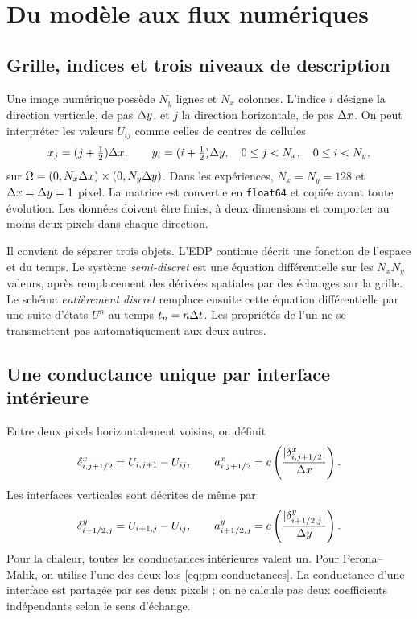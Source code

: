 \section{Du modèle aux flux numériques}
\label{sec:schemes}

\subsection{Grille, indices et trois niveaux de description}

Une image numérique possède $N_y$ lignes et $N_x$ colonnes. L'indice $i$
désigne la direction verticale, de pas $\Delta y$, et $j$ la direction
horizontale, de pas $\Delta x$. On peut interpréter les valeurs $U_{ij}$
comme celles de centres de cellules
\begin{equation}
 x_j=(j+\tfrac12)\Delta x,\qquad y_i=(i+\tfrac12)\Delta y,
 \quad 0\leq j<N_x,\quad 0\leq i<N_y,
 \label{eq:cell-centres}
\end{equation}
sur $\Omega=(0,N_x\Delta x)\times(0,N_y\Delta y)$. Dans les expériences,
$N_x=N_y=128$ et $\Delta x=\Delta y=1$ pixel. La matrice est convertie en
\texttt{float64} et copiée avant toute évolution. Les données doivent
être finies, à deux dimensions et comporter au moins deux pixels dans
chaque direction.

Il convient de séparer trois objets. L'EDP continue décrit une fonction
de l'espace et du temps. Le système \emph{semi-discret} est une équation
différentielle sur les $N_xN_y$ valeurs, après remplacement des
dérivées spatiales par des échanges sur la grille. Le schéma
\emph{entièrement discret} remplace ensuite cette équation différentielle
par une suite d'états $U^n$ au temps $t_n=n\Delta t$. Les propriétés de l'un
ne se transmettent pas automatiquement aux deux autres.

\subsection{Une conductance unique par interface intérieure}

Entre deux pixels horizontalement voisins, on définit
\begin{equation}
 \delta^x_{i,j+1/2}=U_{i,j+1}-U_{ij},\qquad
 a^x_{i,j+1/2}=c\left(\frac{|\delta^x_{i,j+1/2}|}{\Delta x}\right).
 \label{eq:horizontal-interface}
\end{equation}
Les interfaces verticales sont décrites de même par
\begin{equation}
 \delta^y_{i+1/2,j}=U_{i+1,j}-U_{ij},\qquad
 a^y_{i+1/2,j}=c\left(\frac{|\delta^y_{i+1/2,j}|}{\Delta y}\right).
 \label{eq:vertical-interface}
\end{equation}
Pour la chaleur, toutes les conductances intérieures valent un.
Pour Perona--Malik, on utilise l'une des deux lois
\eqref{eq:pm-conductances}. La conductance d'une interface est
partagée par ses deux pixels ; on ne calcule pas deux coefficients
indépendants selon le sens d'échange.

